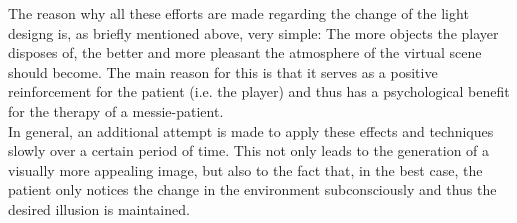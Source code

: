 The reason why all these efforts are made regarding the change of the light designg is, as briefly mentioned above, very simple: The more objects the player disposes of, the better and more pleasant the atmosphere of the virtual scene should become. The main reason for this is that it serves as a positive reinforcement for the patient (i.e. the player) and thus has a psychological benefit for the therapy of a messie-patient.\\
In general, an additional attempt is made to apply these effects and techniques slowly over a certain period of time. This not only leads to the generation of a visually more appealing image, but also to the fact that, in the best case, the patient only notices the change in the environment subconsciously and thus the desired illusion is maintained.
\\